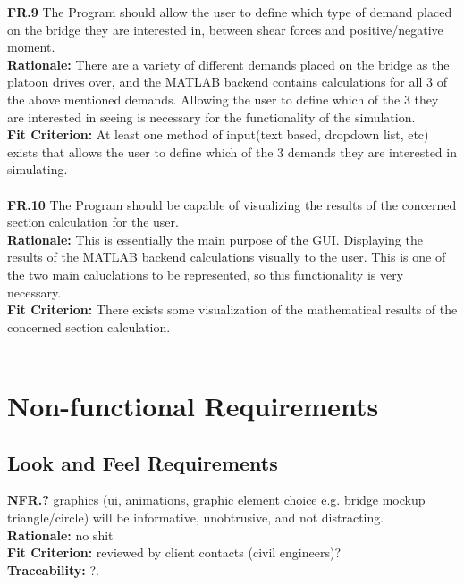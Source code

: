 \documentclass[12pt]{article}
\begin{document}
  \textbf{FR.9} The Program should allow the user to define which type of demand placed on the bridge they are interested in, between shear forces and positive/negative moment.\\
  \textbf{Rationale:} There are a variety of different demands placed on the bridge as the platoon drives over, and the MATLAB backend contains calculations for all 3 of the
  above mentioned demands. Allowing the user to define which of the 3 they are interested in seeing is necessary for the functionality of the simulation.\\
  \textbf{Fit Criterion:} At least one method of input(text based, dropdown list, etc) exists that allows the user to define which of the 3 demands they are interested in
  simulating.\\\\

  \textbf{FR.10} The Program should be capable of visualizing the results of the concerned section calculation for the user.\\
  \textbf{Rationale:} This is essentially the main purpose of the GUI. Displaying the results of the MATLAB backend calculations visually to the user. This is one of the two
  main caluclations to be represented, so this functionality is very necessary.\\
  \textbf{Fit Criterion:} There exists some visualization of the mathematical results of the concerned section calculation.\\\\


\section{Non-functional Requirements}

\subsection{Look and Feel Requirements}

  \textbf{NFR.?} graphics (ui, animations, graphic element choice e.g. bridge mockup triangle/circle) will be informative, unobtrusive, and not distracting.\\
  \textbf{Rationale:} no shit\\
  \textbf{Fit Criterion:} reviewed by client contacts (civil engineers)?\\
  \textbf{Traceability:} ?.\\\\
\end{document}

